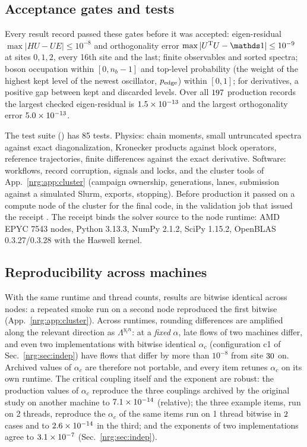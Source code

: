 \subsection{Acceptance gates and tests}
Every result record passed these gates before it was accepted: eigen-residual $\max|HU-UE|\le10^{-8}$ and orthogonality error
$\max|U^{\rm T}U-\one|\le10^{-9}$ at sites $0,1,2$, every 16th site and the last; finite observables and sorted spectra; boson
occupation within $[0,n_b-1]$ and top-level probability (the weight of the highest kept level of the newest oscillator,
$p_{\rm edge}$) within $[0,1]$; for derivatives, a positive gap between kept and discarded levels. Over all $197$ production
records the largest checked eigen-residual is $1.5\times10^{-13}$ and the largest orthogonality error $5.0\times10^{-13}$.

The test suite () has 85 tests. Physics: chain moments, small untruncated spectra against exact diagonalization,
Kronecker products against block operators, reference trajectories, finite differences against the exact derivative. Software:
workflows, record corruption, signals and locks, and the cluster tools of App.~\ref{nrg:app:cluster} (campaign ownership, generations,
lanes, submission against a simulated Slurm, exports, stopping). Before production it passed on a compute node of the cluster for the
final code, in the validation job that issued the receipt . The receipt binds the
solver source to the node runtime: AMD EPYC 7543 nodes, Python 3.13.3, NumPy 2.1.2, SciPy 1.15.2, OpenBLAS 0.3.27/0.3.28 with the
Haswell kernel.

\subsection{Reproducibility across machines}
With the same runtime and thread counts, results are bitwise identical across nodes: a repeated smoke run on a second node reproduced
the first bitwise (App.~\ref{nrg:app:cluster}). Across runtimes, rounding differences are amplified along the relevant direction as
$\Lambda^{y_tn}$: at a \emph{fixed} $\alpha$, late flows of two machines differ, and even two implementations with bitwise identical
$\alpha_c$ (configuration c1 of Sec.~\ref{nrg:sec:indep}) have flows that differ by more than $10^{-8}$ from site $30$ on.
Archived values of $\alpha_c$ are therefore not portable, and every item retunes $\alpha_c$ on its own runtime. The critical coupling
itself and the exponent are robust: the production values of $\alpha_c$ reproduce the three couplings archived by the original study
on another machine to $7.1\times10^{-14}$ (relative); the three example items, run on 2 threads, reproduce the $\alpha_c$ of the same items
run on 1 thread bitwise in $2$ cases and to $2.6\times10^{-14}$ in the third; and the exponents of two implementations agree to
$3.1\times10^{-7}$ (Sec.~\ref{nrg:sec:indep}).

